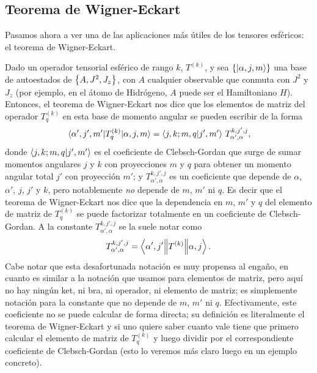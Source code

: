 \documentclass[10pt, a4paper]{article}
\numberwithin{equation}{subsection}
\begin{document}
\subsection{Teorema de Wigner-Eckart}

Pasamos ahora a ver una de las aplicaciones más útiles de los tensores
esféricos: el teorema de Wigner-Eckart.

Dado un operador tensorial esférico de rango $k$, $T^{(k)}$, y sea
$\set{\ket{\alpha,j,m}}$ una base de autoestados de $\set{A, J^2, J_z}$, con
$A$ cualquier observable que conmuta con $J^2$ y $J_z$ (por ejemplo, en el
átomo de Hidrógeno, $A$ puede ser el Hamiltoniano $H$). Entonces, el teorema de
Wigner-Eckart nos dice que los elementos de matriz del operador $T^{(k)}_q$ en
esta base de momento angular se pueden escribir de la forma
\begin{equation} \label{eq:teowe}
  \matrixel{\alpha',j',m'}{T^{(k)}_{q}}{\alpha,j,m} =
    \ClebschGordan{j}{k}{m}{q}{j'}{m'} \, T_{\alpha',\alpha}^{k,j',j},
\end{equation}
donde $\braket{{j},{k};{m},{q}}{{j'},{m'}}$ es el coeficiente de Clebsch-Gordan
que surge de sumar momentos angulares $j$ y $k$ con proyecciones $m$ y $q$ para
obtener un momento angular total $j'$ con proyección $m'$; y
$T_{\alpha',\alpha}^{k,j',j}$ es un coeficiente que depende de $\alpha$,
$\alpha'$, $j$, $j'$ y $k$, pero notablemente \emph{no} depende de $m$, $m'$ ni
$q$. Es decir que el teorema de Wigner-Eckart nos dice que la dependencia en
$m$, $m'$ y $q$ del elemento de matriz de $T^{(k)}_q$ se puede factorizar
totalmente en un coeficiente de Clebsch-Gordan. A la constante
$T_{\alpha',\alpha}^{k,j',j}$ se la suele notar como
\begin{equation}
  T_{\alpha',\alpha}^{k,j',j} = \left\langle{\alpha',j'}\middle\|{T^{(k)}}\middle\|{\alpha,j}\right\rangle.
\end{equation}
Cabe notar que esta desafortunada notación es muy propensa al engaño, en cuanto
es similar a la notación que usamos para elementos de matriz, pero aquí no hay
ningún ket, ni bra, ni operador, ni elemento de matriz; es simplemente notación
para la constante que no depende de $m$, $m'$ ni $q$. Efectivamente, este
coeficiente no se puede calcular de forma directa; su definición es
literalmente el teorema de Wigner-Eckart y si uno quiere saber cuanto vale
tiene que primero calcular el elemento de matriz de $T^{(k)}_q$ y luego dividir
por el correspondiente coeficiente de Clebsch-Gordan (esto lo veremos más claro
luego en un ejemplo concreto).
\end{document}
